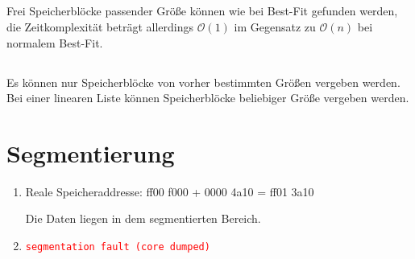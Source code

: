 \documentclass[DIN, pagenumber=false, fontsize=11pt, parskip=half]{scrartcl}
\begin{document}
    \subsection{}
    Frei Speicherblöcke passender Größe können wie bei Best-Fit gefunden werden, die Zeitkomplexität beträgt allerdings $\mathcal{O}(1)$ im Gegensatz zu 
    $\mathcal{O}(n)$ bei normalem Best-Fit.

    \subsection{}
    Es können nur Speicherblöcke von vorher bestimmten Größen vergeben werden. Bei einer linearen Liste können Speicherblöcke beliebiger Größe vergeben werden.

    \section{Segmentierung}
    \begin{enumerate}[label=(\alph*)]
        \item Reale Speicheraddresse: ff00 f000 + 0000 4a10 = ff01 3a10

            Die Daten liegen in dem segmentierten Bereich.
        \item \texttt{\textcolor{red}{segmentation fault (core dumped)}}
    \end{enumerate}
\end{document}
